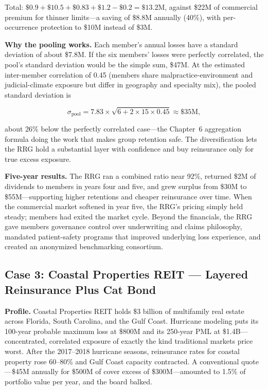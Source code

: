 \documentclass[11pt,openany]{book}
\begin{document}
Total: \(\$0.9 + \$10.5 + \$0.83 + \$1.2 - \$0.2 = \$13.2\)M, against \$22M
of commercial premium for thinner limits---a saving of \$8.8M annually
(40\%), with per-occurrence protection to \$10M instead of \$3M.

\textbf{Why the pooling works.} Each member's annual losses have a standard
deviation of about \$7.8M. If the six members' losses were perfectly
correlated, the pool's standard deviation would be the simple sum, \$47M. At
the estimated inter-member correlation of 0.45 (members share
malpractice-environment and judicial-climate exposure but differ in geography
and specialty mix), the pooled standard deviation is

\[
\sigma_{\text{pool}} = 7.83 \times \sqrt{6 + 2 \times 15 \times 0.45}
\approx \$35\text{M},
\]

about 26\% below the perfectly correlated case---the
Chapter~6 aggregation formula doing the work that
makes group retention safe. The diversification lets the RRG hold a
substantial layer with confidence and buy reinsurance only for true excess
exposure.

\textbf{Five-year results.} The RRG ran a combined ratio near 92\%, returned
\$2M of dividends to members in years four and five, and grew surplus from
\$30M to \$55M---supporting higher retentions and cheaper reinsurance over
time. When the commercial market softened in year five, the RRG's pricing
simply held steady; members had exited the market cycle. Beyond the
financials, the RRG gave members governance control over underwriting and
claims philosophy, mandated patient-safety programs that improved underlying
loss experience, and created an anonymized benchmarking consortium.

\subsection{Case 3: Coastal Properties REIT --- Layered Reinsurance Plus Cat
Bond}
\label{subsec:reit-case}

\textbf{Profile.} Coastal Properties REIT holds \$3 billion of multifamily
real estate across Florida, South Carolina, and the Gulf Coast. Hurricane
modeling puts its 100-year probable maximum loss at \$800M and its 250-year
PML at \$1.4B---concentrated, correlated exposure of exactly the kind
traditional markets price worst. After the 2017--2018 hurricane seasons,
reinsurance rates for coastal property rose 60--80\% and Gulf Coast capacity
contracted. A conventional quote---\$45M annually for \$500M of cover excess
of \$300M---amounted to 1.5\% of portfolio value per year, and the board
balked.
\end{document}
